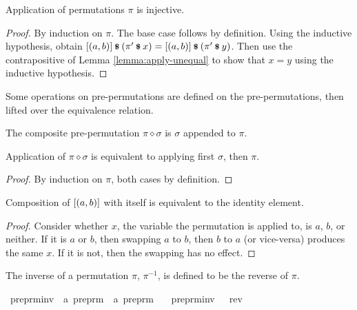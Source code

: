 \begin{lemma}
Application of permutations \(\pi\) is injective.
\end{lemma}
\begin{proof}
By induction on \(\pi\).
The base case follows by definition.
Using the inductive hypothesis, obtain \([(a, b)] \mathbin{\textrm{\footnotesize{\textbf{\$}}}} \left(\pi' \mathbin{\textrm{\footnotesize{\textbf{\$}}}} x\right) = [(a, b)] \mathbin{\textrm{\footnotesize{\textbf{\$}}}} \left(\pi' \mathbin{\textrm{\footnotesize{\textbf{\$}}}} y\right)\).
Then use the contrapositive of Lemma \ref{lemma:apply-unequal} to show that \(x = y\) using the inductive hypothesis.
\end{proof}

Some operations on pre-permutations are defined on the pre-permutations, then lifted over the equivalence relation.

\begin{definition}
The composite pre-permutation \(\pi \diamond \sigma\) is \(\sigma\) appended to \(\pi\).
\end{definition}

\begin{lemma}
\label{lemma:apply-composition}
Application of \(\pi \diamond \sigma\) is equivalent to applying first \(\sigma\), then \(\pi\).
\end{lemma}
\begin{proof}
By induction on \(\pi\), both cases by definition.
\end{proof}

\begin{lemma}
\label{lemma:unit-involution}
Composition of \([\left(a, b\right)]\) with itself is equivalent to the identity element.
\end{lemma}
\begin{proof}
Consider whether \(x\), the variable the permutation is applied to, is \(a\), \(b\), or neither.
If it is \(a\) or \(b\), then swapping \(a\) to \(b\), then \(b\) to \(a\) (or vice-versa) produces the same \(x\).
If it is not, then the swapping has no effect.
\end{proof}

\begin{definition}
The inverse of a permutation \(\pi\), \(\pi^{-1}\), is defined to be the reverse of \(\pi\).
\end{definition}

\begin{implementation}
\isamarkupfalse%
\ preprm{\isacharunderscore}inv\ {\isacharcolon}{\isacharcolon}\ {\isachardoublequoteopen}{\isacharprime}a\ preprm\ {\isasymRightarrow}\ {\isacharprime}a\ preprm{\isachardoublequoteclose}\ \isanewline
\ \ {\isachardoublequoteopen}preprm{\isacharunderscore}inv\ {\isasympi}\ {\isasymequiv}\ rev\ {\isasympi}{\isachardoublequoteclose}
\end{implementation}

